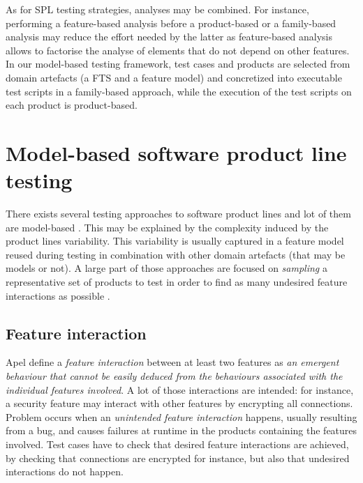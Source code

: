 As for SPL testing strategies, analyses may be combined. For instance, performing a feature-based analysis before a product-based or a family-based analysis may reduce the effort needed by the latter as feature-based analysis allows to factorise the analyse of elements that do not depend on other features. In our model-based testing framework, test cases and products are selected from domain artefacts (\ie a \gls{FTS} and a \gls{feature model}) and concretized into executable test scripts in a family-based approach, while the execution of the test scripts on each product is product-based.


\section{Model-based software product line testing}

\label{sec:mbtspltesting}

There exists several testing approaches to software product lines and lot of them are model-based \cite{Oster2011,Engstrom2011,Machado2014}. This may be explained by the complexity induced by the product lines variability. This variability is usually captured in a feature model reused during testing in combination with other domain artefacts (that may be models or not). A large part of those approaches are focused on \emph{sampling} a representative set of products to test in order to find as many undesired feature interactions as possible \cite{Machado2014}. 

\subsection{Feature interaction}


Apel \etal \cite{Apel2013} define a \emph{feature interaction} between at least two features as \textit{an emergent behaviour that cannot be easily deduced from the behaviours associated with the individual features involved}. A lot of those interactions are intended: for instance, a security feature may interact with other features by encrypting all connections. Problem occurs when an \emph{unintended feature interaction} happens, usually resulting from a bug, and causes failures at runtime in the products containing the features involved. Test cases have to check that desired feature interactions are achieved, by checking that connections are encrypted for instance, but also that undesired interactions do not happen.

